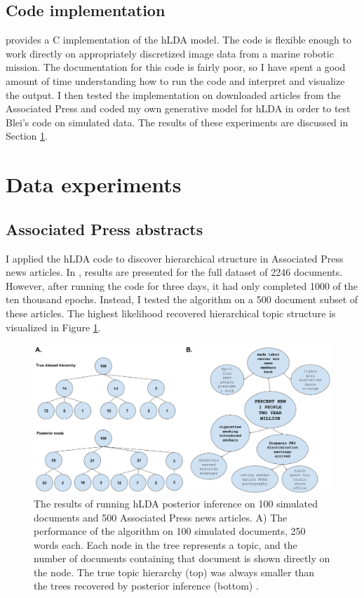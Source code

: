 \documentclass{article}
\begin{document}
\subsection{Code implementation}
\citet{Blei2010} provides a C implementation of the hLDA model. The code is flexible enough to work directly on appropriately discretized image data from a marine robotic mission. The documentation for this code is fairly poor, so I have spent a good amount of time understanding how to run the code and interpret and visualize the output. I then tested the implementation on downloaded articles from the Associated Press and coded my own generative model for hLDA in order to test Blei's code on simulated data. The results of these experiments are discussed in Section \ref{sec:exp}.

\section{Data experiments}
\label{sec:exp}
\subsection{Associated Press abstracts}
I applied the hLDA code to discover hierarchical structure in Associated Press news articles. In \citet{Blei2010}, results are presented for the full dataset of 2246 documents. However, after running the code for three days, it had only completed 1000 of the ten thousand epochs. Instead, I tested the algorithm on a 500 document subset of these articles. The highest likelihood recovered hierarchical topic structure is visualized in Figure \ref{fig:sim}.

\begin{figure}[h]
  \centering
    \includegraphics[scale=0.25]{sim}
  \caption{The results of running hLDA posterior inference on 100 simulated documents and 500 Associated Press news articles. A) The performance of the algorithm on 100 simulated documents, 250 words each. Each node in the tree represents a topic, and the number of documents containing that document is shown directly on the node. The true topic hierarchy (top) was always smaller than the trees recovered by posterior inference (bottom) .}
  \label{fig:sim}
\end{figure}
\end{document}
